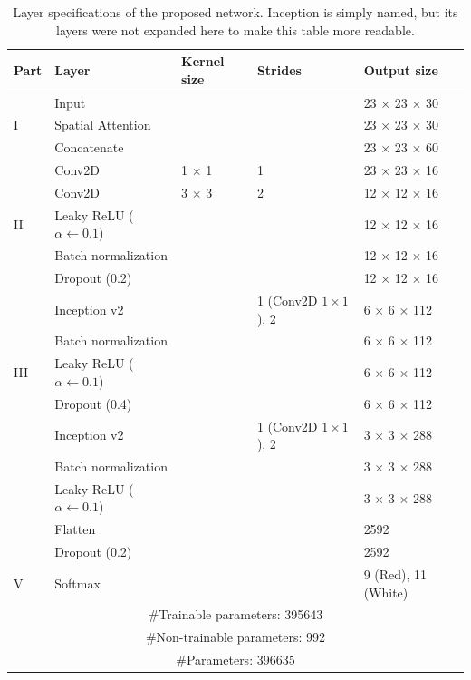 \newcommand{\kernelSize}[1]{#1 $\times$ #1}
\newcommand{\outputSize}[2]{#1 $\times$ #1 $\times$ #2}
\renewcommand{\arraystretch}{1}
\begin{table}
\centering
\caption{Layer specifications of the proposed network. Inception is simply named, but its layers were not expanded here to make this table more readable. \\ }
\label{table:cnn_architecture}
\begin{tabular}{lllll}
\toprule
Part & Layer & Kernel size & Strides & Output size\\
\midrule
\multirow{3}{*}{I} & Input & & & \outputSize{23}{30}\\
& Spatial Attention & & & \outputSize{23}{30}\\
& Concatenate & & & \outputSize{23}{60}\\
\midrule
\multirow{5}{*}{II} & Conv2D & \kernelSize{1} & 1 & \outputSize{23}{16}\\
& Conv2D & \kernelSize{3} & 2 & \outputSize{12}{16}\\
& Leaky ReLU ($\alpha \gets 0.1$) & & & \outputSize{12}{16}\\
& Batch normalization & & & \outputSize{12}{16}\\
& Dropout (0.2) & & & \outputSize{12}{16}\\
\midrule
\multirow{5}{*}{III} & Inception v2 & & 1 (Conv2D $1 \times 1$), 2 & \outputSize{6}{112} \\
& Batch normalization & & & \outputSize{6}{112}\\
& Leaky ReLU ($\alpha \gets 0.1$) & & & \outputSize{6}{112}\\
& Dropout (0.4) & & & \outputSize{6}{112}\\
\midrule
\multirow{5}{*}{IV} & Inception v2 & & 1 (Conv2D $1 \times 1$), 2 & \outputSize{3}{288}\\
& Batch normalization & & & \outputSize{3}{288}\\
& Leaky ReLU ($\alpha \gets 0.1$) & & & \outputSize{3}{288}\\
& Flatten & & & 2592\\
& Dropout (0.2) & & & 2592\\
\midrule
\multirow{1}{*}{V} & Softmax & & & 9 (Red), 11 (White)\\
\midrule
\multicolumn{5}{c}{\#Trainable parameters: 395643}\\
\multicolumn{5}{c}{\#Non-trainable parameters: 992}\\
\multicolumn{5}{c}{\#Parameters: 396635}\\
\bottomrule
\end{tabular}
\end{table}
\renewcommand{\arraystretch}{1}

